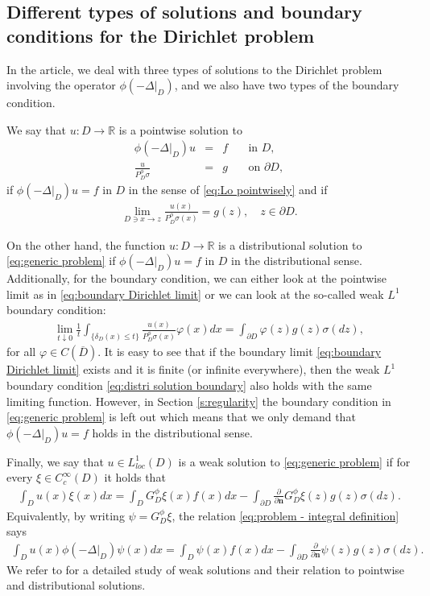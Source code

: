 \documentclass[12pt,a4paper,onecolumn]{amsart}
\theoremstyle{definition}
\newcommand{\R}{\mathbb{R}}
\newcommand{\1}{\mathbf 1}
\newcommand{\Lo}{\phi(-\left.\Delta\right\vert_{D})}
\newcommand{\GDfi}{G^\phi_{ D}}
\newcommand{\GDFI}{\GDfi}
\newcommand{\PDfi}{P^\phi_{ D}}
\newcommand{\PDFI}{\PDfi}
\newcommand{\de}{\delta_D}
\numberwithin{equation}{section}
\begin{document}
\subsection{Different types of solutions and boundary conditions for the Dirichlet problem}\label{ss:dirichlet problem}
In the article, we deal with three types of solutions to the Dirichlet problem involving the operator $\Lo$, and we also have two types of the boundary condition.

We say that $u:D\to \R$ is a pointwise solution to 
\begin{equation}\label{eq:generic problem}
	\begin{array}{rcll}
		\Lo u&=& f& \quad \text{in } D,\\
		\frac{u}{\PDFI\sigma}&=&g&\quad \text{on }\partial D,
	\end{array}
\end{equation}
if $\Lo u =f$ in $D$ in the sense of \eqref{eq:Lo pointwisely} and if
\begin{align}\label{eq:boundary Dirichlet limit}
    \lim_{D \ni x \to z}\frac{u(x)}{\PDFI\sigma(x)}=g(z),\quad  z\in \partial D.
\end{align}

On the other hand, the function $u:D\to \R$ is a distributional solution to \eqref{eq:generic problem} if $\Lo u =f$ in $D$ in the distributional sense. Additionally, for the boundary condition, we can either look at the pointwise limit as in \eqref{eq:boundary Dirichlet limit} or we can look at the so-called weak $L^1$ boundary condition: 
\begin{align}\label{eq:distri solution boundary}
			\lim_{t\downarrow 0}\frac1t \int_{\{\de(x)\le t\}}\frac{u(x)}{\PDFI\sigma(x)}\varphi(x)dx=\int_{\partial D}\varphi(z)g(z)\sigma(dz),
\end{align}
for all $\varphi \in C(\overline D)$. It is easy to see that if the boundary limit \eqref{eq:boundary Dirichlet limit} exists and it is finite (or infinite everywhere), then the weak $L^1$ boundary condition \eqref{eq:distri solution boundary} also holds with the same limiting function.
However, in Section \ref{s:regularity} the boundary condition in \eqref{eq:generic problem} is left out which means that we only demand that $\Lo u=f$ holds in the distributional sense.

Finally, we say that $u\in L^1_{loc}(D)$ is a weak solution to \eqref{eq:generic problem} if for every $\xi\in C_c^\infty(D)$ it holds that
		\begin{align}\label{eq:problem - integral definition}
			\int_D u(x)\xi(x)dx=\int_D\GDfi\xi(x)f(x)dx-\int_{\partial D}\frac{\partial}{\partial \mathbf{n}}\GDfi\xi(z)g(z)\sigma(dz).
		\end{align}
Equivalently, by writing $\psi=\GDFI\xi$, the relation \eqref{eq:problem - integral definition} says
\begin{align}\label{eq:problem - integral definition1}
			\int_D u(x)\Lo \psi(x)dx=\int_D\psi(x) f(x)dx-\int_{\partial D}\frac{\partial}{\partial \mathbf{n}}\psi(z)g(z)\sigma(dz).
\end{align}
We refer to \cite{Bio23} for a detailed study of weak solutions and their relation to pointwise and distributional solutions.
\end{document}
